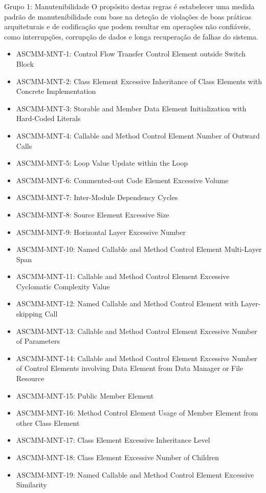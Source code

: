 \documentclass[openany,10pt,a4paper]{article}
\begin{document}
\begin{appendix}
Grupo 1: Manutenibilidade
O propósito destas regras é estabelecer uma medida padrão de manutenibilidade com base na deteção de violações de boas práticas arquiteturais e de codificação que podem resultar em operações não confiáveis, como interrupções, corrupção de dados e longa recuperação de falhas do sistema.
\begin{samepage}
\begin{itemize}[]
	\setlength\itemsep{0em}
	\item ASCMM-MNT-1: Control Flow Transfer Control Element outside Switch Block
	\item ASCMM-MNT-2: Class Element Excessive Inheritance of Class Elements with Concrete Implementation
	\item ASCMM-MNT-3: Storable and Member Data Element Initialization with Hard-Coded Literals
	\item ASCMM-MNT-4: Callable and Method Control Element Number of Outward Calls
	\item ASCMM-MNT-5: Loop Value Update within the Loop
	\item ASCMM-MNT-6: Commented-out Code Element Excessive Volume
	\item ASCMM-MNT-7: Inter-Module Dependency Cycles
	\item ASCMM-MNT-8: Source Element Excessive Size
	\item ASCMM-MNT-9: Horizontal Layer Excessive Number
	\item ASCMM-MNT-10: Named Callable and Method Control Element Multi-Layer Span
	\item ASCMM-MNT-11: Callable and Method Control Element Excessive Cyclomatic Complexity Value
	\item ASCMM-MNT-12: Named Callable and Method Control Element with Layer-skipping Call
	\item ASCMM-MNT-13: Callable and Method Control Element Excessive Number of Parameters
	\item ASCMM-MNT-14: Callable and Method Control Element Excessive Number of Control Elements involving Data Element from Data Manager or File Resource
	\item ASCMM-MNT-15: Public Member Element	
	\item ASCMM-MNT-16: Method Control Element Usage of Member Element from other Class Element
	\item ASCMM-MNT-17: Class Element Excessive Inheritance Level
	\item ASCMM-MNT-18: Class Element Excessive Number of Children
	\item ASCMM-MNT-19: Named Callable and Method Control Element Excessive Similarity

\end{itemize}
\end{samepage}
\end{appendix}
\end{document}
